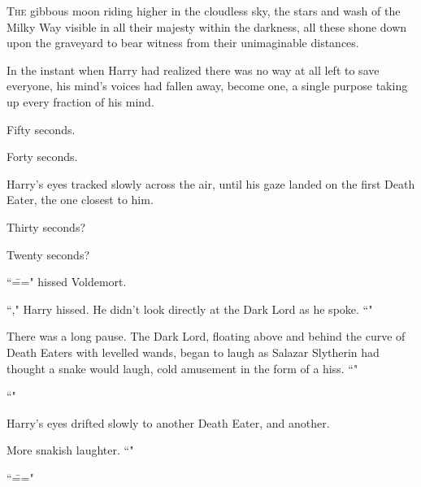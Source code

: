 
\lettrine{T}{he} gibbous moon riding higher in the cloudless sky, the stars and wash of the Milky Way visible in all their majesty within the darkness, all these shone down upon the graveyard to bear witness from their unimaginable distances.

In the instant when Harry had realized there was no way at all left to save everyone, his mind's voices had fallen away, become one, a single purpose taking up every fraction of his mind.

Fifty seconds.

Forty seconds.

Harry's eyes tracked slowly across the air, until his gaze landed on the first Death Eater, the one closest to him.

Thirty seconds?

Twenty seconds?

``\===" hissed Voldemort.

``," Harry hissed. He didn't look directly at the Dark Lord as he spoke. ``"

There was a long pause. The Dark Lord, floating above and behind the curve of Death Eaters with levelled wands, began to laugh as Salazar Slytherin had thought a snake would laugh, cold amusement in the form of a hiss. ``"

``"

Harry's eyes drifted slowly to another Death Eater, and another.

More snakish laughter. ``"

``\==="

